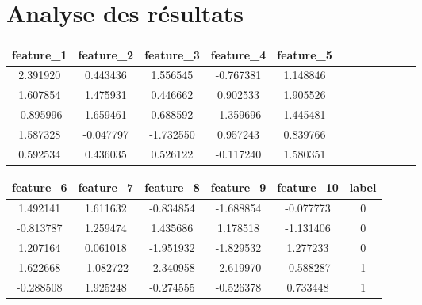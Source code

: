 \documentclass[12pt,a4paper,openay]{book}
\numberwithin{equation}{chapter}
\begin{document}
	\section{Analyse des r\'esultats}
	\begin{table}[ht]
	    \centering
	    \begin{tabular}{|c|c|c|c|c|c|c|c|c|c|c|c|}
	        \hline
	        feature\_1 & feature\_2 & feature\_3 & feature\_4 & feature\_5\\
	        \hline
	        2.391920 & 0.443436 & 1.556545 & -0.767381 & 1.148846 \\
	        1.607854 & 1.475931 & 0.446662 & 0.902533 & 1.905526 \\
	        -0.895996 & 1.659461 & 0.688592 & -1.359696 & 1.445481\\
	        1.587328 & -0.047797 & -1.732550 & 0.957243 & 0.839766 \\
	        0.592534 & 0.436035 & 0.526122 & -0.117240 & 1.580351 \\
	        \hline
	    \end{tabular}
	\end{table}
	\begin{table}[ht]
		    \centering
		    \begin{tabular}{|c|c|c|c|c|c|}
		        \hline
		         feature\_6 & feature\_7 & feature\_8 & feature\_9 & feature\_10 & label \\
		        \hline
		        1.492141 & 1.611632 & -0.834854 & -1.688854 & -0.077773 & 0 \\
			 -0.813787 & 1.259474 & 1.435686 & 1.178518 & -1.131406 & 0 \\
			 1.207164 & 0.061018 & -1.951932 & -1.829532 & 1.277233 & 0 \\
			 1.622668 & -1.082722 & -2.340958 & -2.619970 & -0.588287 & 1 \\
			 -0.288508 & 1.925248 & -0.274555 & -0.526378 & 0.733448 & 1 \\
		        \hline
		    \end{tabular}
		\end{table}
\end{document}

